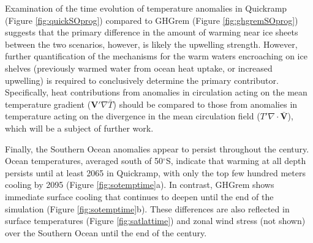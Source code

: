 \documentclass[grl]{AGUTeX}  %
\begin{document}
\begin{article}
%
%
%

Examination of the time evolution of temperature anomalies in Quickramp (Figure \ref{fig:quickSOprog}) compared to GHGrem (Figure \ref{fig:ghgremSOprog}) suggests that the primary difference in the amount of warming near ice sheets between the two scenarios, however, is likely the upwelling strength. However, further quantification of the mechanisms for the warm waters encroaching on ice shelves (previously warmed water from ocean heat uptake, or increased upwelling) is required to conclusively determine the primary contributor. Specifically, heat contributions from anomalies in circulation acting on the mean temperature gradient ($\textbf{V}' \nabla \bar{T}$) should be compared to those from anomalies in temperature acting on the divergence in the mean circulation field ($T'\nabla\cdot \bar{\textbf{V}}$), which will be a subject of further work.



Finally, the Southern Ocean anomalies appear to persist throughout the century. Ocean temperatures, averaged south of 50$^\circ$S, indicate that warming at all depth persists until at least 2065 in Quickramp, with only the top few hundred meters cooling by 2095 (Figure \ref{fig:sotemptime}a). In contrast, GHGrem shows immediate surface cooling that continues to deepen until the end of the simulation (Figure \ref{fig:sotemptime}b). These differences are also reflected in surface temperatures (Figure \ref{fig:satlattime}) and zonal wind stress (not shown) over the Southern Ocean until the end of the century.


\end{article}
\end{document}
